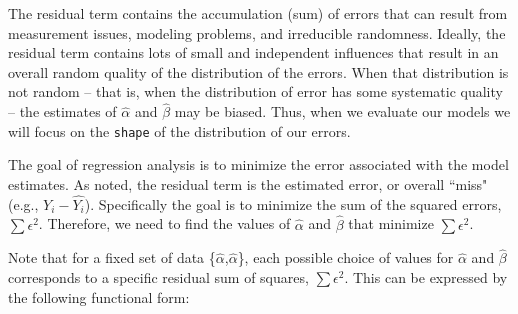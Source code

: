 \documentclass[11pt,openany]{book}\usepackage[]{graphicx}\usepackage[]{color}
\begin{document}
The residual term contains the accumulation (sum) of errors that can result from measurement issues, modeling problems, and irreducible randomness. Ideally, the residual term contains lots of small and independent influences that result in an overall random quality of the distribution of the errors. When that distribution is not random -- that is, when the distribution of error has some systematic quality -- the estimates of $\hat{\alpha}$ and $\hat{\beta}$ may be biased. Thus, when we evaluate our models we will focus on the \texttt{shape} of the distribution of our errors. 

\begin{grbox}
\end{grbox}

The goal of regression analysis is to minimize the error associated with the model estimates. As noted, the residual term is the estimated error, or overall ``miss" (e.g., $Y_{i}-\hat{Y_{i}}$). Specifically the goal is to minimize the sum of the squared errors, $\sum \epsilon^{2}$. Therefore, we need to find the values of $\hat{\alpha}$ and $\hat{\beta}$ that minimize $\sum \epsilon^{2}$. 

Note that for a fixed set of data \{$\hat{\alpha}$,$\hat{\alpha}$\}, each possible choice of values for $\hat{\alpha}$ and $\hat{\beta}$ corresponds to a specific residual sum of squares, $\sum \epsilon^{2}$. This can be expressed by the following functional form:
\end{document}
